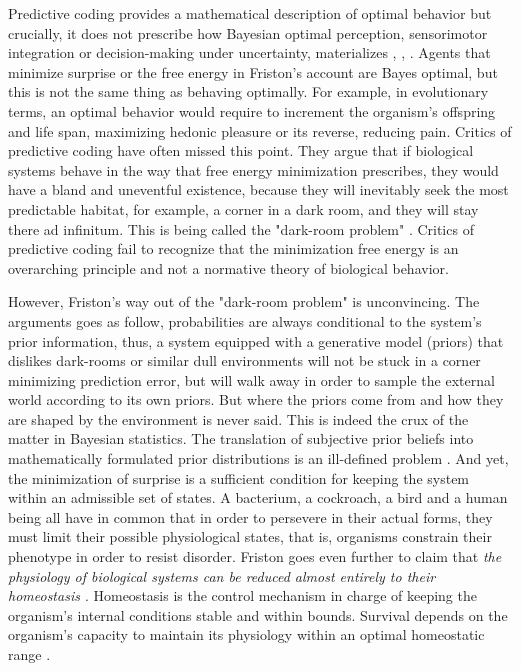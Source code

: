 \documentclass[11pt,twocolumn]{article}
\begin{document}
Predictive coding provides a mathematical description of optimal behavior but crucially, it does not prescribe how Bayesian optimal perception, sensorimotor integration or decision-making under uncertainty, materializes  \citep{Friston:2001}, \citep{friston:2009}, \citep{friston_history_2012}.
Agents that minimize surprise or the free energy in Friston's account are Bayes optimal, but this is not the same thing as behaving optimally. For example, in evolutionary terms, an optimal behavior would require to increment the organism's offspring and life span, maximizing hedonic pleasure or its reverse, reducing pain.
Critics of predictive coding have often missed this point. 
They argue that if biological systems behave in the way that free energy minimization prescribes, they would have a bland and uneventful existence, because they will inevitably seek the most predictable habitat, for example, a corner in a dark room, and they will stay there ad infinitum. This is being called the "dark-room problem" \citep{friston_free-energy_2012}. 
Critics of predictive coding fail to recognize that the minimization free energy is an overarching principle and not a normative theory of biological behavior. 

However, Friston's way out of the "dark-room problem" is unconvincing. The arguments goes as follow, probabilities are always conditional to the system's prior information, thus, a system equipped with a generative model (priors) that dislikes dark-rooms or similar dull environments will not be stuck in a corner minimizing prediction error, but will walk away in order to sample the external world according to its own priors.
But where the priors come from and how they are shaped by the environment is never said. This is indeed the crux of the matter in Bayesian statistics. The translation of subjective prior beliefs into mathematically formulated prior distributions is an ill-defined problem \citep{Gomez-ramirez_limitations_2013}. 
And yet, the minimization of surprise is a sufficient condition for keeping the system within an admissible set of states. A bacterium, a cockroach, a bird and a human being all have in common that in order to persevere in their actual forms, they must limit their possible physiological states, that is, organisms constrain their phenotype in order to resist disorder. Friston goes even further to claim that \emph{the physiology of biological systems can be reduced almost entirely to their homeostasis \citep{friston_free-energy_2010}}. 
Homeostasis is the control mechanism in charge of keeping the organism's internal conditions stable and within bounds. Survival depends on the organism's capacity to maintain its physiology within an optimal homeostatic range \citep{damasio_nature_2013}. 
\end{document}
